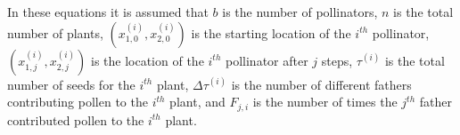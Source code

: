 In these equations it is assumed that $b$ is the number of pollinators, $n$ is
the total number of plants, $(x_{1,0}^{(i)},x_{2,0}^{(i)})$ is the starting
location of the $i^{th}$ pollinator, $(x_{1,j}^{(i)},x_{2,j}^{(i)})$ is the
location of the $i^{th}$ pollinator after $j$ steps, $\tau^{(i)}$ is the total
number of seeds for the $i^{th}$ plant, $\Delta\tau^{(i)}$ is the number of
different fathers contributing pollen to the $i^{th}$ plant, and $F_{j,i}$ is
the number of times the $j^{th}$ father contributed pollen to the $i^{th}$
plant.
